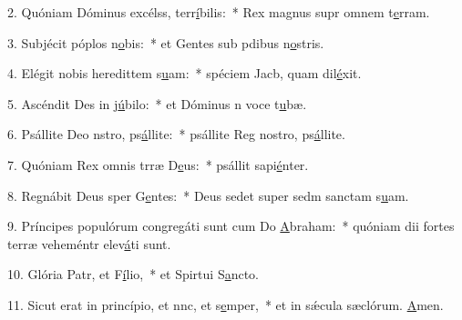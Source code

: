 2. Quóniam Dóminus excélss, terr\uline{í}bilis:~* Rex magnus supr omnem t\uline{e}rram.\par 
3. Subjécit póplos n\uline{o}bis:~* et Gentes sub pdibus n\uline{o}stris.\par 
4. Elégit nobis heredittem s\uline{u}am:~* spéciem Jacb, quam dil\uline{é}xit.\par 
5. Ascéndit Des in j\uline{ú}bilo:~* et Dóminus n voce t\uline{u}bæ.\par 
6. Psállite Deo nstro, ps\uline{á}llite:~* psállite Reg nostro, ps\uline{á}llite.\par 
7. Quóniam Rex omnis trræ D\uline{e}us:~* psállit sapi\uline{é}nter.\par 
8. Regnábit Deus sper G\uline{e}ntes:~* Deus sedet super sedm sanctam s\uline{u}am.\par 
9. Príncipes populórum congregáti sunt cum Do \uline{A}braham:~* quóniam dii fortes terræ veheméntr elev\uline{á}ti sunt.\par 
10. Glória Patr, et F\uline{í}lio,~* et Spirtui S\uline{a}ncto.\par 
11. Sicut erat in princípio, et nnc, et s\uline{e}mper,~* et in sǽcula sæclórum. \uline{A}men.\par 
